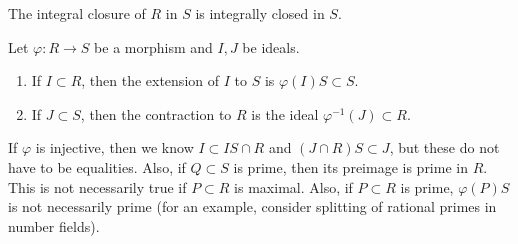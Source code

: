 \documentclass[10pt, twoside]{article}
\begin{document}
        \begin{cor}
            The integral closure of $R$ in $S$ is integrally closed in $S$.
        \end{cor}
               
        \begin{defn}
            Let $\varphi:R \to S$ be a morphism and $I,J$ be ideals.
            \begin{enumerate}
                \item If $I \subset R$, then the extension of $I$ to $S$ is $\varphi(I)S \subset S$.
                \item If $J \subset S$, then the contraction to $R$ is the ideal $\varphi^{-1}(J) \subset R$.
            \end{enumerate}
        \end{defn}

        If $\varphi$ is injective, then we know $I \subset IS \cap R$ and $(J \cap R)S \subset J$, but these do not have to be equalities. Also, if $Q \subset S$ is prime, then its preimage is prime in $R$. This is not necessarily true if $P \subset R$ is maximal. Also, if $P \subset R$ is prime, $\varphi(P)S$ is not necessarily prime (for an example, consider splitting of rational primes in number fields).
        
\end{document}
